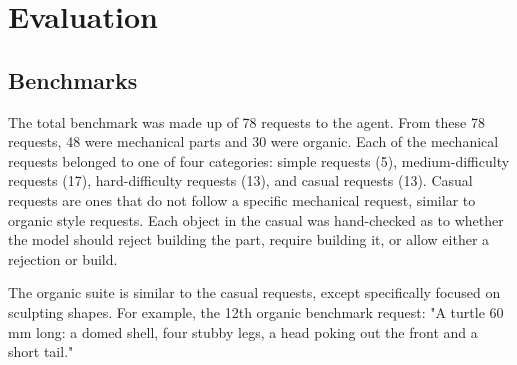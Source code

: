 \section{Evaluation}
\label{sec:evaluation}


\subsection{Benchmarks}

The total benchmark was made up of 78 requests to the agent.
From these 78 requests, 48 were mechanical parts and 30 were organic.
Each of the mechanical requests belonged to one of four categories: simple requests (5), medium-difficulty requests (17), hard-difficulty requests (13), and casual requests (13).
Casual requests are ones that do not follow a specific mechanical request, similar to organic style requests.
Each object in the casual was hand-checked as to whether the model should reject building the part, require building it, or allow either a rejection or build.

The organic suite is similar to the casual requests, except specifically focused on sculpting shapes.
For example, the 12th organic benchmark request: "A turtle 60 mm long: a domed shell, four stubby legs, a head poking out the front and a short tail."

